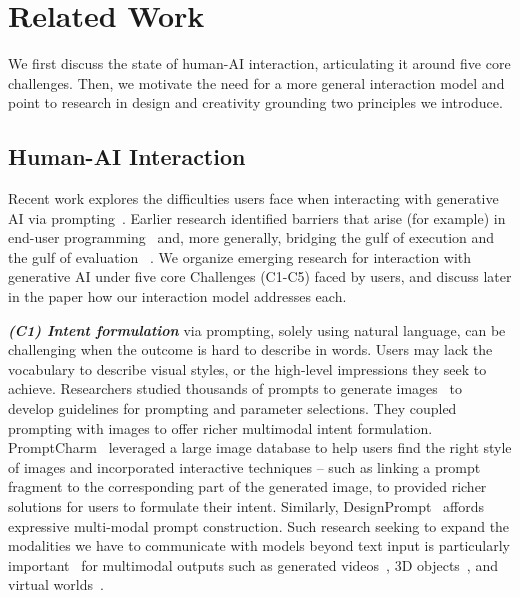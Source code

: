 \section{Related Work}

We first discuss the state of human-AI interaction, articulating it around five core challenges. Then, we motivate the need for a more general interaction model and point to research in design and creativity grounding two principles we introduce.



\subsection{Human-AI Interaction}
\label{sec:challenges}
Recent work explores the difficulties users face when interacting with generative AI via prompting~\cite{zamfirescu-pereira_why_2023, subramonyam_bridging_2024, mahdavi_goloujeh_is_2024, peng_designprompt}. Earlier research identified barriers that arise (for example) in end-user programming~\cite{ko2004six} and, more generally, bridging the gulf of execution and the gulf of evaluation ~\cite{norman1986cognitive}. We organize emerging research for interaction with generative AI under five core Challenges (C1-C5) faced by users, and discuss later in the paper how our interaction model addresses each.


\vspace{5pt}\textit{\textbf{(C1) Intent formulation}} via prompting, solely using natural language, can be challenging when the outcome is hard to describe in words. 
Users may lack the vocabulary to describe visual styles, or the high-level impressions they seek to achieve. Researchers studied thousands of prompts to generate images~\cite{liu_design_2022} to develop guidelines for prompting and parameter selections. They coupled prompting with images to offer richer multimodal intent formulation. PromptCharm~\cite{wang_promptcharm_2024} leveraged a large image database to help users find the right style of images and incorporated interactive techniques -- such as linking a prompt fragment to the corresponding part of the generated image, to provided richer solutions for users to formulate their intent. Similarly, DesignPrompt~\cite{peng_designprompt} affords expressive multi-modal prompt construction. Such research seeking to expand the modalities we have to communicate with models beyond text input is particularly important~\cite{liu_beyond_2023} for multimodal outputs such as generated videos~\cite{villegas2022phenaki}, 3D objects~\cite{poole2022dreamfusion}, and virtual worlds~\cite{rosenberg_drawtalking_2024}. 


